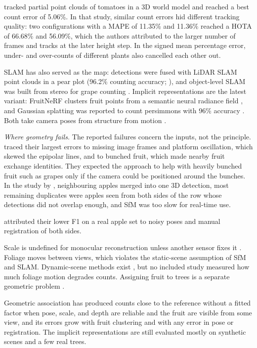 \citet{rapadorincon2023development} tracked partial point clouds of tomatoes in a 3D world model and reached a best count error of 5.06\%. In that study, similar count errors hid different tracking quality: two configurations with a MAPE of 11.35\% and 11.36\% reached a HOTA of 66.68\% and 56.09\%, which the authors attributed to the larger number of frames and tracks at the later height step. In the signed mean percentage error, under- and over-counts of different plants also cancelled each other out.

SLAM has also served as the map: detections were fused with LiDAR SLAM point clouds in a pear plot (96.2\% counting accuracy; \citealp{lee2026lidarcamera}), and object-level SLAM was built from stereo for grape counting \citep{nellithimaru2019rols}. Implicit representations are the latest variant: FruitNeRF clusters fruit points from a semantic neural radiance field \citep{meyer2024fruitnerf}, and Gaussian splatting was reported to count persimmons with 96\% accuracy \citep{hong2025fruitgaussian}. Both take camera poses from structure from motion \citep{meyer2024fruitnerf,kerbl20233d}.

\textit{Where geometry fails.} The reported failures concern the inputs, not the principle. \citet{stein2016image} traced their largest errors to missing image frames and platform oscillation, which skewed the epipolar lines, and to bunched fruit, which made nearby fruit exchange identities. They expected the approach to help with heavily bunched fruit such as grapes only if the camera could be positioned around the bunches. In the study by \citet{genemola2020fruitb}, neighbouring apples merged into one 3D detection, most remaining duplicates were apples seen from both sides of the row whose detections did not overlap enough, and SfM was too slow for real-time use.

\citet{meyer2025fruitnerf} attributed their lower F1 on a real apple set to noisy poses and manual registration of both sides.

Scale is undefined for monocular reconstruction unless another sensor fixes it \citep{liu2019monocular}. Foliage moves between views, which violates the static-scene assumption of SfM and SLAM. Dynamic-scene methods exist \citep{bescos2021dynaslam}, but no included study measured how much foliage motion degrades counts. Assigning fruit to trees is a separate geometric problem \citep{zineelabidine2021assigning}.

Geometric association has produced counts close to the reference without a fitted factor when pose, scale, and depth are reliable and the fruit are visible from some view, and its errors grow with fruit clustering and with any error in pose or registration. The implicit representations are still evaluated mostly on synthetic scenes and a few real trees.


